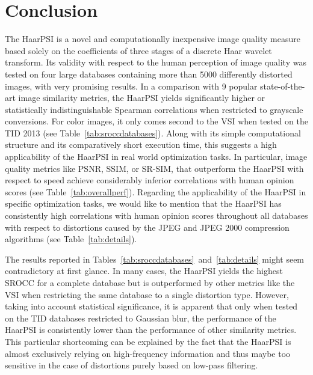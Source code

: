\documentclass[11pt,a4paper]{article}
\begin{document}
\section{Conclusion}

The HaarPSI is a novel and computationally inexpensive image quality measure based solely on the coefficients of three stages of a discrete Haar wavelet transform. Its validity with respect to the human perception of image quality was tested on four large databases containing more than 5000 differently distorted images, with very promising results. In a comparison with 9 popular state-of-the-art image similarity metrics, the HaarPSI yields significantly higher or statistically indistinguishable Spearman correlations when restricted to grayscale conversions. For color images, it only comes second to the VSI when tested on the TID 2013 (see Table~\ref{tab:sroccdatabases}). Along with its simple computational structure and its comparatively short execution time, this suggests a high applicability of the HaarPSI in real world optimization tasks. In particular, image quality metrics like PSNR, SSIM, or SR-SIM, that outperform the HaarPSI with respect to speed achieve considerably inferior correlations with human opinion scores (see Table~\ref{tab:overallperf}). Regarding the applicability of the HaarPSI in specific optimization tasks, we would like to mention that the HaarPSI has consistently high correlations with human opinion scores throughout all databases with respect to distortions caused by the JPEG and JPEG 2000 compression algorithms (see Table~\ref{tab:details}).  

The results reported in Tables~\ref{tab:sroccdatabases}~and~\ref{tab:details} might seem contradictory at first glance. In many cases, the HaarPSI yields the highest SROCC for a complete database but is outperformed by other metrics like the VSI when restricting the same database to a single distortion type. However, taking into account statistical significance, it is apparent that only when tested on the TID databases restricted to Gaussian blur, the performance of the HaarPSI is consistently lower than the performance of other similarity metrics. This particular shortcoming can be explained by the fact that the HaarPSI is almost exclusively relying on high-frequency information and thus maybe too sensitive in the case of distortions purely based on low-pass filtering.
\end{document}
